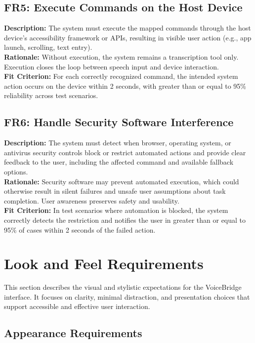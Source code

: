 \documentclass[11pt]{article}
\begin{document}
\bigskip
\subsection{FR5: Execute Commands on the Host Device}\label{fr:FR5}
\textbf{Description:} The system must execute the mapped commands through the host device’s accessibility framework or APIs, resulting in visible user action (e.g., app launch, scrolling, text entry).\\
\textbf{Rationale:} Without execution, the system remains a transcription tool only. Execution closes the loop between speech input and device interaction.\\
\textbf{Fit Criterion:} For each correctly recognized command, the intended system action occurs on the device within 2 seconds, with greater than or equal to 95\% reliability across test scenarios.

\bigskip
\subsection{FR6: Handle Security Software Interference}\label{fr:FR6}
\textbf{Description:} The system must detect when browser, operating system, or antivirus security controls block or restrict automated actions and provide clear feedback to the user, including the affected command and available fallback options.\\
\textbf{Rationale:} Security software may prevent automated execution, which could otherwise result in silent failures and unsafe user assumptions about task completion. User awareness preserves safety and usability.\\
\textbf{Fit Criterion:} In test scenarios where automation is blocked, the system correctly detects the restriction and notifies the user in greater than or equal to 95\% of cases within 2 seconds of the failed action.

\section{Look and Feel Requirements}\label{sec:look-feel}
This section describes the visual and stylistic expectations for the VoiceBridge interface. It focuses on clarity, minimal distraction, and presentation choices that support accessible and effective user interaction.

\subsection{Appearance Requirements}\label{subsec:appearance}
\end{document}
